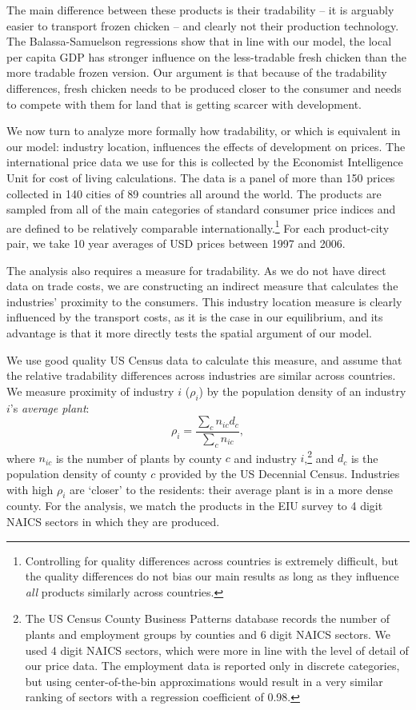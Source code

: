 \documentclass[12pt]{article}
\begin{document}
The main difference between these products is their tradability -- it is arguably easier to transport frozen chicken -- and clearly not their production technology. The Balassa-Samuelson regressions show that in line with our model, the local per capita GDP has stronger influence on the less-tradable fresh chicken than the more tradable frozen version. Our argument is that because of the tradability differences, fresh chicken needs to be produced closer to the consumer and needs to compete with them for land that is getting scarcer with development. 

We now turn to analyze more formally how tradability, or which is equivalent in our model: industry location, influences the effects of development on prices. The international price data we use for this is collected by the Economist Intelligence Unit for cost of living calculations. The data is a panel of more than 150 prices collected in 140 cities of 89 countries all around the world. The products are sampled from all of the main categories of standard consumer price indices and are defined to be relatively comparable internationally.\footnote{Controlling for quality differences across countries is extremely difficult, but the quality differences do not bias our main results as long as they influence \emph{all} products similarly across countries.} For each product-city pair, we take 10 year averages of USD prices between 1997 and 2006.

The analysis also requires a measure for tradability. As we do not have direct data on trade costs, we are constructing an indirect measure that calculates the industries' proximity to the consumers. This industry location measure is clearly influenced by the transport costs, as it is the case in our equilibrium, and its advantage is that it more directly tests the spatial argument of our model. 

We use good quality US Census data to calculate this measure, and assume that the relative tradability differences across industries are similar across countries. We measure proximity of industry $i$ ($\rho_i$) by the population density of an industry $i$'s \emph{average plant}:
\begin{equation*}
\rho_i=\frac{\sum_cn_{ic}d_c}{\sum_cn_{ic}},
\end{equation*}
where $n_{ic}$ is the number of plants by county $c$ and industry $i$,\footnote{The US Census County Business Patterns database records the number of plants and employment groups by counties and 6 digit NAICS sectors. We used 4 digit NAICS sectors, which were more in line with the level of detail of our price data. The employment data is reported only in discrete categories, but using center-of-the-bin approximations would result in a very similar ranking of sectors with a regression coefficient of 0.98.} and $d_c$ is the population density of county $c$ provided by the US Decennial Census. Industries with high $\rho_i$ are `closer' to the residents: their average plant is in a more dense county. For the analysis, we match the products in the EIU survey to 4 digit NAICS sectors in which they are produced.
\end{document}

